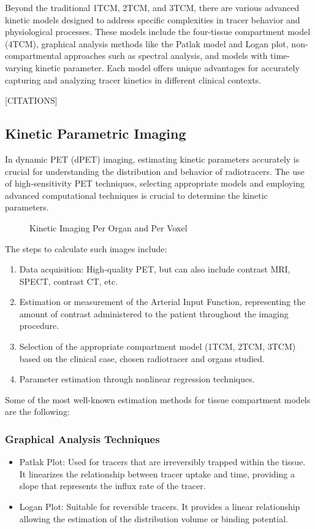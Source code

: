 Beyond the traditional 1TCM, 2TCM, and 3TCM, there are various advanced kinetic models designed to address specific complexities in tracer behavior and physiological processes. These models include the four-tissue compartment model (4TCM), graphical analysis methods like the Patlak model and Logan plot, non-compartmental approaches such as spectral analysis, and models with time-varying kinetic parameter. Each model offers unique advantages for accurately capturing and analyzing tracer kinetics in different clinical contexts. 

[CITATIONS]

\subsection{Kinetic Parametric Imaging}

In dynamic PET (dPET) imaging, estimating kinetic parameters accurately is crucial for understanding the distribution and behavior of radiotracers. The use of high-sensitivity PET techniques, selecting appropriate models and employing advanced computational techniques is crucial to determine the kinetic parameters.

\begin{figure}[h]
    \centering
    \caption{Kinetic Imaging Per Organ and Per Voxel}
    \label{fig:kinetic_imaging}
\end{figure}

The steps to calculate such images include:

\begin{enumerate}
    \item Data acquisition: High-quality PET, but can also include contrast MRI, SPECT, contrast CT, etc.
    \item Estimation or measurement of the Arterial Input Function, representing the amount of contrast administered to the patient throughout the imaging procedure.
    \item Selection of the appropriate compartment model (1TCM, 2TCM, 3TCM) based on the clinical case, chosen radiotracer and organs studied.
    \item Parameter estimation through nonlinear regression techniques.
\end{enumerate}

Some of the most well-known estimation methods for tissue compartment models are the following:

\subsubsection{Graphical Analysis Techniques}
\begin{itemize}
    \item Patlak Plot: Used for tracers that are irreversibly trapped within the tissue. It linearizes the relationship between tracer uptake and time, providing a slope that represents the influx rate of the tracer.
    \item Logan Plot: Suitable for reversible tracers. It provides a linear relationship allowing the estimation of the distribution volume or binding potential.
\end{itemize}

